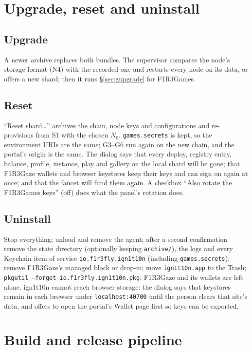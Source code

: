 \documentclass[11pt]{article}
\theoremstyle{definition}
\theoremstyle{remark}
\newcommand{\code}[1]{\texttt{#1}}
\newcommand{\Gz}{F1R3Gaze}
\newcommand{\Hr}{ign1t10n}
\newcommand{\Gm}{F1R3Games}
\begin{document}
\section{Upgrade, reset and uninstall}\label{sec:lifecycle}

\subsection{Upgrade}
A newer archive replaces both bundles. The supervisor compares the node's storage
format (N4) with the recorded one and restarts every node on its data, or offers a new
shard; then it runs \S\ref{sec:gupgrade} for \Gm{}.

\subsection{Reset}\label{sec:reset}
``Reset shard\ldots'' archives the chain, node keys and configurations and
re-provisions from S1 with the chosen $N_0$. \code{games.secrets} is kept, so the
environment URIs are the same; G3--G6 run again on the new chain, and the portal's
origin is the same. The dialog says that every deploy, registry entry, balance,
profile, instance, play and gallery on the local shard will be gone; that \Gz{}
wallets and browser keystores keep their keys and can sign on again at once; and that
the faucet will fund them again. A checkbox ``Also rotate the \Gm{} keys'' (off) does
what the panel's rotation does.

\subsection{Uninstall}\label{sec:uninstall}
Stop everything; unload and remove the agent; after a second confirmation remove the
state directory (optionally keeping \code{archive/}), the logs and every Keychain
item of service \code{io.f1r3fly.ign1t10n} (including \code{games.secrets}); remove
\Gz{}'s managed block or drop-in; move \code{ign1t10n.app} to the Trash;
\code{pkgutil --forget io.f1r3fly.ign1t10n.pkg}. \Gz{} and its wallets are left
alone. \Hr{} cannot reach browser storage: the dialog says that keystores remain in
each browser under \code{localhost:40700} until the person clears that site's data,
and offers to open the portal's Wallet page first so keys can be exported.

\section{Build and release pipeline}\label{sec:pipeline}
\end{document}
